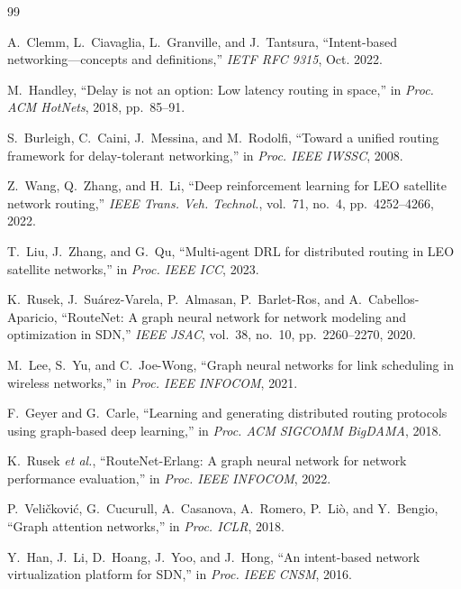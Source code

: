 \documentclass[10pt, conference, letterpaper]{IEEEtran}
\begin{document}
\begin{thebibliography}{99}

A.~Clemm, L.~Ciavaglia, L.~Granville, and J.~Tantsura,
``Intent-based networking---concepts and definitions,''
\textit{IETF RFC 9315}, Oct. 2022.

M.~Handley, ``Delay is not an option: Low latency routing in space,''
in \textit{Proc. ACM HotNets}, 2018, pp.~85--91.

S.~Burleigh, C.~Caini, J.~Messina, and M.~Rodolfi,
``Toward a unified routing framework for delay-tolerant networking,''
in \textit{Proc. IEEE IWSSC}, 2008.

Z.~Wang, Q.~Zhang, and H.~Li,
``Deep reinforcement learning for LEO satellite network routing,''
\textit{IEEE Trans. Veh. Technol.}, vol.~71, no.~4, pp.~4252--4266, 2022.

T.~Liu, J.~Zhang, and G.~Qu,
``Multi-agent DRL for distributed routing in LEO satellite networks,''
in \textit{Proc. IEEE ICC}, 2023.

K.~Rusek, J.~Su\'{a}rez-Varela, P.~Almasan, P.~Barlet-Ros, and
A.~Cabellos-Aparicio, ``RouteNet: A graph neural network for network
modeling and optimization in SDN,'' \textit{IEEE JSAC}, vol.~38,
no.~10, pp.~2260--2270, 2020.

M.~Lee, S.~Yu, and C.~Joe-Wong,
``Graph neural networks for link scheduling in wireless networks,''
in \textit{Proc. IEEE INFOCOM}, 2021.

F.~Geyer and G.~Carle,
``Learning and generating distributed routing protocols using
graph-based deep learning,'' in \textit{Proc. ACM SIGCOMM BigDAMA},
2018.

K.~Rusek \textit{et al.},
``RouteNet-Erlang: A graph neural network for network performance
evaluation,'' in \textit{Proc. IEEE INFOCOM}, 2022.

P.~Veli\v{c}kovi\'{c}, G.~Cucurull, A.~Casanova, A.~Romero,
P.~Li\`{o}, and Y.~Bengio, ``Graph attention networks,''
in \textit{Proc. ICLR}, 2018.

Y.~Han, J.~Li, D.~Hoang, J.~Yoo, and J.~Hong,
``An intent-based network virtualization platform for SDN,''
in \textit{Proc. IEEE CNSM}, 2016.


\end{thebibliography}
\end{document}

